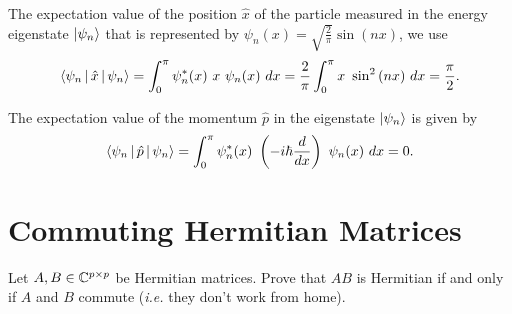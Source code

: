 \documentclass{article}
\begin{document}
The expectation value of the position $\hat{x}$ of the particle measured in the energy eigenstate $\ket{\psi_n}$ that is represented by $\psi_n(x) = \sqrt{\frac{2}{\pi}} \sin{(nx)}$, we use
\begin{equation}
    \Braket{\psi_n | \hat{x} | \psi_n} = \int_{0}^{\pi} \psi_n^*(x)\ x\ \psi_n(x)\ dx = \frac{2}{\pi} \int_{0}^{\pi} x\ \sin^2{(nx)}\ dx = \frac{\pi}{2}.
\end{equation}

The expectation value of the momentum $\hat{p}$ in the eigenstate $\ket{\psi_n}$ is given by
\begin{equation}
    \Braket{\psi_n | \hat{p} | \psi_n} = \int_{0}^{\pi} \psi_n^*(x)\ \left( -i\hbar\frac{d}{dx} \right)\ \psi_n(x)\ dx = 0.
\end{equation}

\section{Commuting Hermitian Matrices}

Let $A, B \in \mathbb{C}^{p \times p}$ be Hermitian matrices. Prove that $AB$ is Hermitian if and only if $A$ and $B$ commute (\textit{i.e.} they don't work from home).
\end{document}
